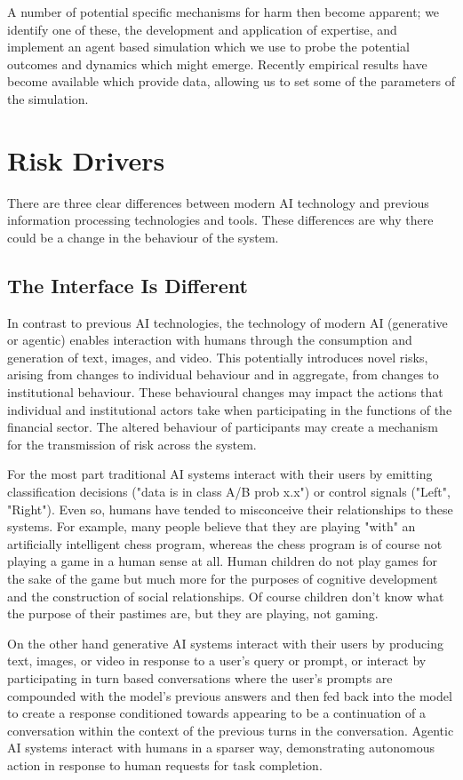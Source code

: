 \documentclass[11pt]{article}
\begin{document}
A number of potential specific mechanisms for harm then become apparent; we identify one of these, the development and application of expertise, and implement an agent based simulation which we use to probe the potential outcomes and dynamics which might emerge. Recently empirical results have become available which provide data, allowing us to set some of the parameters of the simulation. 

\section{Risk Drivers} \label{sec:risk_drivers}
There are three clear differences between modern AI technology and previous information processing technologies and tools. These differences are why there could be a change in the behaviour of the system.

\subsection{The Interface Is Different}
In contrast to previous AI technologies, the technology of modern AI (generative or agentic) enables interaction with humans through the consumption and generation of text, images, and video. This potentially introduces novel risks, arising from changes to individual behaviour and in aggregate, from changes to institutional behaviour. These behavioural changes may impact the actions that individual and institutional actors take when participating in the functions of the financial sector. The altered behaviour of participants may create a mechanism for the transmission of risk across the system.

For the most part traditional AI systems interact with their users by emitting classification decisions ("data is in class A/B prob x.x") or control signals ("Left", "Right"). Even so, humans have tended to misconceive their relationships to these systems. For example, many people believe that they are playing "with" an artificially intelligent chess program, whereas the chess program is of course not playing a game in a human sense at all. Human children do not play games for the sake of the game but much more for the purposes of cognitive development and the construction of social relationships. Of course children don't know what the purpose of their pastimes are, but they are playing, not gaming. 
 
On the other hand generative AI systems interact with their users by producing text, images, or video in response to a user's query or prompt, or interact by participating in turn based conversations where the user's prompts are compounded with the model's previous answers and then fed back into the model to create a response conditioned towards appearing to be a continuation of a conversation within the context of the previous turns in the conversation. Agentic AI systems interact with humans in a sparser way, demonstrating autonomous action in response to human requests for task completion.
\end{document}
